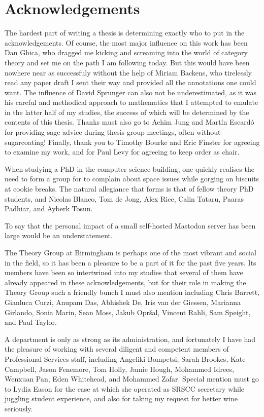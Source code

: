 \chapter{Acknowledgements}\label{chap:acknowledgements}

The hardest part of writing a thesis is determining exactly who to put in the
acknowledgements.
Of course, the most major influence on this work has been Dan Ghica, who dragged
me kicking and screaming into the world of category theory and set me on the
path I am following today.
But this would have been nowhere near as successfuly without the help of Miriam
Backens, who tirelessly read any paper draft I sent their way and provided all
the annotations one could want.
The influence of David Sprunger can also not be underestimated, as it was his
careful and methodical approach to mathematics that I attempted to emulate in
the latter half of my studies, the success of which will be determined by the
contents of this thesis.
Thanks must also go to Achim Jung and Martín Escardó for providing sage advice
during thesis group meetings, often without sugarcoating!
Finally, thank you to Timothy Bourke and Eric Finster for agreeing to examine
my work, and for Paul Levy for agreeing to keep order as chair.

When studying a PhD in the computer science building, one quickly realises the
need to form a group for to complain about space issues while gorging on
biscuits at cookie breaks.
The natural allegiance that forms is that of fellow theory PhD students, and
Nicolas Blanco, Tom de Jong, Alex Rice, Calin Tataru, Paaras Padhiar, and Ayberk
Tosun.

To say that the personal impact of a small self-hosted Mastodon server has been
large would be an understatement.


The Theory Group at Birmingham is perhaps one of the most vibrant and social
in the field, so it has been a pleasure to be a part of it for the past five
years.
Its members have been so intertwined into my studies that several of them have
already appeared in these acknowledgements, but for their role in making the
Theory Group such a friendly bunch I must also mention including Chris Barrett,
Gianluca Curzi, Anupam Das, Abhishek De, Iris van der Giessen, Marianna
Girlando, Sonia Marin, Sean Moss, Jakub Opršal, Vincent Rahli, Sam Speight, and
Paul Taylor.

A department is only as strong as its administration, and fortunately I have had
the pleasure of working with several diligent and competent members of
Professional Services staff, including Angeliki Bompetsi, Sarah Brookes,
Kate Campbell, Jason Fenemore, Tom Holly, Jamie Hough, Mohammed Idrees,
Wenxuan Pan, Eden Whitehead, and Mohammed Zafar.
Special mention must go to Lydia Eason for the ease at which she operated as
SRSCC secretary while juggling student experience, and also for taking my
request for better wine seriously.